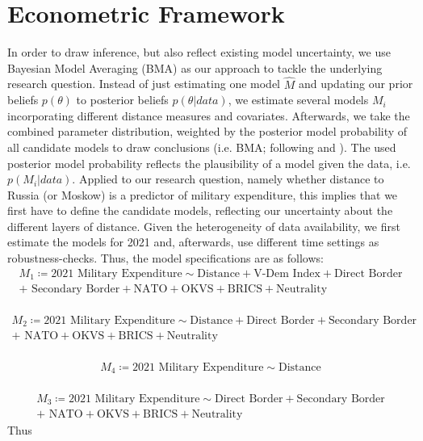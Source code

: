 \documentclass[12pt,a4paper]{article}
\begin{document}
\section{Econometric Framework}
In order to draw inference, but also reflect existing model uncertainty, we use Bayesian Model Averaging (BMA) as our approach to tackle the underlying research question.  Instead of just estimating one model $\hat{M}$ and updating our prior beliefs $p(\theta)$ to posterior beliefs $p(\theta \vert data)$, we estimate several models $M_{i}$ incorporating different distance measures and covariates. Afterwards, we take the combined parameter distribution, weighted by the posterior model probability of all candidate models to draw conclusions (i.e. BMA; following \citealp{jeffreys1939} and \citealp{jevons1874}). The used posterior model probability reflects the plausibility of a model given the data, i.e. $p(M_{i} \vert data)$.
\clearpage 
Applied to our research question, namely whether distance to Russia (or Moskow) is a predictor of military expenditure, this implies that we first have to define the candidate models, reflecting our uncertainty about the different layers of distance. Given the heterogeneity of data availability, we first estimate the models for 2021 and, afterwards, use different time settings as robustness-checks. Thus, the model specifications are as follows: 
\begin{align*}
 M_1 \coloneqq \textrm{2021 Military Expenditure} \sim \textrm{Distance} + \textrm{V-Dem Index} + \textrm{Direct Border} \\ +  \textrm{ Secondary Border} +  \textrm{NATO} + \textrm{OKVS} + \textrm{BRICS} + \textrm{Neutrality} 
\end{align*}\\[-3.5em]
\begin{align*}
 M_2 \coloneqq \textrm{2021 Military Expenditure} \sim \textrm{Distance} + \textrm{Direct Border} + \textrm{Secondary Border} \\ + \textrm{ NATO} + \textrm{OKVS} + \textrm{BRICS} + \textrm{Neutrality} 
\end{align*}\\[-3.5em]
\begin{align*}
M_4 \coloneqq \textrm{2021 Military Expenditure} \sim \textrm{Distance}  
\end{align*}\\[-3.5em]
\begin{align*}
  M_3 \coloneqq \textrm{2021 Military Expenditure} \sim \textrm{Direct Border} + \textrm{Secondary Border} \\ + \textrm{ NATO} + \textrm{OKVS} + \textrm{BRICS} + \textrm{Neutrality} 
\end{align*}
Thus
\end{document}
